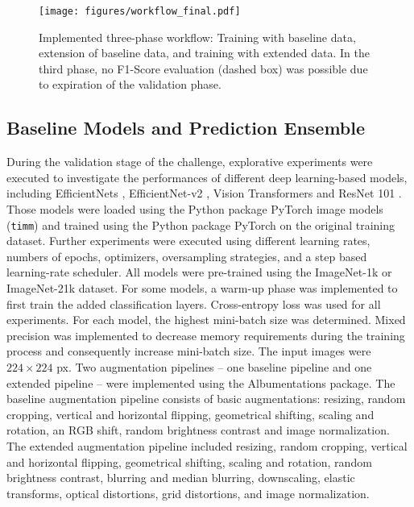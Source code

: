 \documentclass[runningheads]{llncs}
\begin{document}
\begin{figure}[ht!]
    \centering
    \texttt{[image: figures/workflow\_final.pdf]}
    \caption{Implemented three-phase workflow: Training with baseline data, extension of baseline data, and training with extended data. In the third phase, no F1-Score evaluation (dashed box) was possible due to expiration of the validation phase.}
    \label{fig:workflow}
\end{figure}




\subsection{Baseline Models and Prediction Ensemble} %

During the validation stage of the challenge, explorative experiments were executed to investigate the performances of different deep learning-based models, including EfficientNets \cite{EfficientNet}, EfficientNet-v2 \cite{EfficientNetv2}, Vision Transformers \cite{VisionTransformers} and ResNet 101 \cite{ResNet}. Those models were loaded using the Python package PyTorch image models (\texttt{timm}) \cite{rw2019timm} and trained using the Python package PyTorch \cite{PyTorch} on the original training dataset. Further experiments were executed using different learning rates, numbers of epochs, optimizers, oversampling strategies, and a step based learning-rate scheduler. All models were pre-trained using the ImageNet-1k or ImageNet-21k dataset. For some models, a warm-up phase was implemented to first train the added classification layers. 
Cross-entropy loss was used for all experiments. For each model, the highest mini-batch size was determined. Mixed precision \cite{Micikevicius2018} was implemented to decrease memory requirements during the training process and consequently increase mini-batch size. The input images were $224 \times 224$ px.  
Two augmentation pipelines -- one baseline pipeline and one extended pipeline -- were implemented using the Albumentations \cite{Buslaev_2020} package. The baseline augmentation pipeline consists of basic augmentations: resizing, random cropping, vertical and horizontal flipping, geometrical shifting, scaling and rotation, an RGB shift, random brightness contrast and image normalization. The extended augmentation pipeline included resizing, random cropping, vertical and horizontal flipping, geometrical shifting, scaling and rotation, random brightness contrast, blurring and median blurring, downscaling, elastic transforms, optical distortions, grid distortions, and image normalization.
\end{document}
